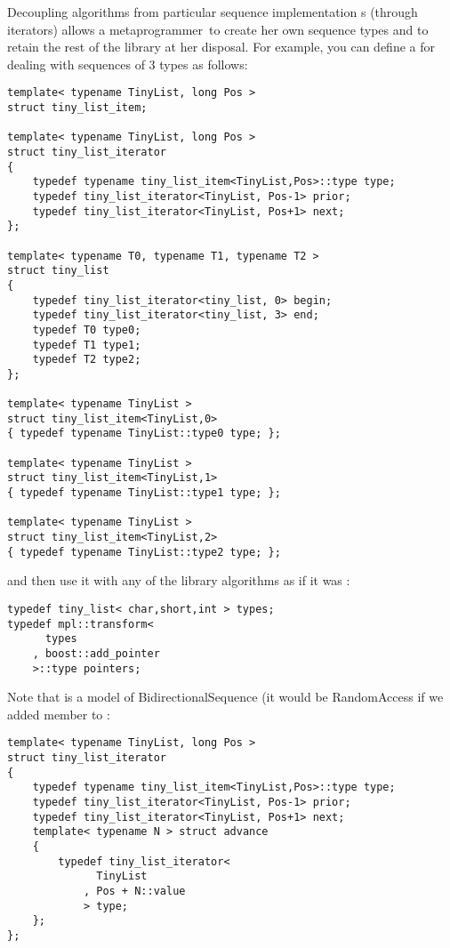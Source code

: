\documentclass{kapproc}
\newcommand{\mpgmer}{meta\-pro\-gram\-mer}
\begin{document}
Decoupling algorithms from particular sequence implementation s
(through iterators) allows a \mpgmer\ to create her own sequence types
and to retain the rest of the library at her disposal. For example,
you can define a  for dealing with sequences of 3
types as follows:

{\small
\begin{codesamp}\begin{verbatim}
template< typename TinyList, long Pos >
struct tiny_list_item;

template< typename TinyList, long Pos >
struct tiny_list_iterator
{
    typedef typename tiny_list_item<TinyList,Pos>::type type;
    typedef tiny_list_iterator<TinyList, Pos-1> prior;
    typedef tiny_list_iterator<TinyList, Pos+1> next;
};

template< typename T0, typename T1, typename T2 >
struct tiny_list
{
    typedef tiny_list_iterator<tiny_list, 0> begin;
    typedef tiny_list_iterator<tiny_list, 3> end;
    typedef T0 type0;
    typedef T1 type1;
    typedef T2 type2;
};

template< typename TinyList >
struct tiny_list_item<TinyList,0>
{ typedef typename TinyList::type0 type; };

template< typename TinyList >
struct tiny_list_item<TinyList,1>
{ typedef typename TinyList::type1 type; };

template< typename TinyList >
struct tiny_list_item<TinyList,2>
{ typedef typename TinyList::type2 type; };
\end{verbatim}
\end{codesamp}
}

and then use it with any of the library algorithms as if it 
was :

{\small
\begin{codesamp}\begin{verbatim}
typedef tiny_list< char,short,int > types;
typedef mpl::transform<
      types
    , boost::add_pointer
    >::type pointers;
\end{verbatim}
\end{codesamp}
}

Note that  is a model of 
BidirectionalSequence (it would be RandomAccess if 
we added  member to :

{\small
\begin{codesamp}\begin{verbatim}
template< typename TinyList, long Pos >
struct tiny_list_iterator
{
    typedef typename tiny_list_item<TinyList,Pos>::type type;
    typedef tiny_list_iterator<TinyList, Pos-1> prior;
    typedef tiny_list_iterator<TinyList, Pos+1> next;
    template< typename N > struct advance
    {
        typedef tiny_list_iterator<
              TinyList
            , Pos + N::value
            > type;
    };
};
\end{verbatim}
\end{codesamp}
}
\end{document}
